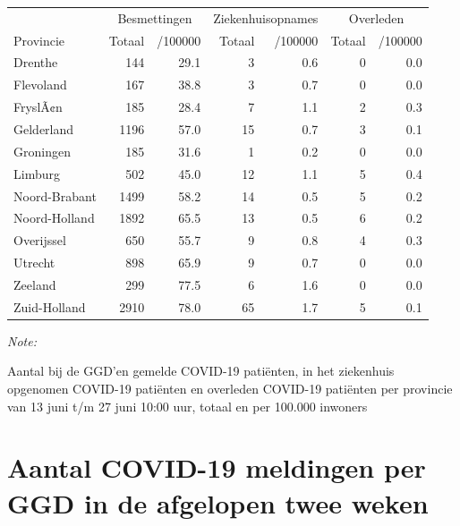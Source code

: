 \documentclass[
  english,
  man,floatsintext]{apa6}
\begin{document}
\begin{table}
\centering
\begin{threeparttable}
\begin{tabular}{lrrrrrr}
\toprule
\multicolumn{1}{c}{ } & \multicolumn{2}{c}{Besmettingen} & \multicolumn{2}{c}{Ziekenhuisopnames} & \multicolumn{2}{c}{Overleden} \\
\cmidrule(l{3pt}r{3pt}){2-3} \cmidrule(l{3pt}r{3pt}){4-5} \cmidrule(l{3pt}r{3pt}){6-7}
Provincie & Totaal & /100000 & Totaal & /100000 & Totaal & /100000\\
\midrule
Drenthe & 144 & 29.1 & 3 & 0.6 & 0 & 0.0\\
Flevoland & 167 & 38.8 & 3 & 0.7 & 0 & 0.0\\
FryslÃ¢n & 185 & 28.4 & 7 & 1.1 & 2 & 0.3\\
Gelderland & 1196 & 57.0 & 15 & 0.7 & 3 & 0.1\\
Groningen & 185 & 31.6 & 1 & 0.2 & 0 & 0.0\\
Limburg & 502 & 45.0 & 12 & 1.1 & 5 & 0.4\\
Noord-Brabant & 1499 & 58.2 & 14 & 0.5 & 5 & 0.2\\
Noord-Holland & 1892 & 65.5 & 13 & 0.5 & 6 & 0.2\\
Overijssel & 650 & 55.7 & 9 & 0.8 & 4 & 0.3\\
Utrecht & 898 & 65.9 & 9 & 0.7 & 0 & 0.0\\
Zeeland & 299 & 77.5 & 6 & 1.6 & 0 & 0.0\\
Zuid-Holland & 2910 & 78.0 & 65 & 1.7 & 5 & 0.1\\
\bottomrule
\end{tabular}
\begin{tablenotes}
\item \textit{Note: } 
\item Aantal bij de GGD’en gemelde COVID-19 patiënten, in het ziekenhuis opgenomen COVID-19 patiënten en overleden COVID-19 patiënten per provincie van 13 juni t/m 27 juni 10:00 uur, totaal en per 100.000 inwoners
\end{tablenotes}
\end{threeparttable}
\end{table}

\newpage

\hypertarget{aantal-covid-19-meldingen-per-ggd-in-de-afgelopen-twee-weken}{%
\section{Aantal COVID-19 meldingen per GGD in de afgelopen twee weken}\label{aantal-covid-19-meldingen-per-ggd-in-de-afgelopen-twee-weken}}
\end{document}
